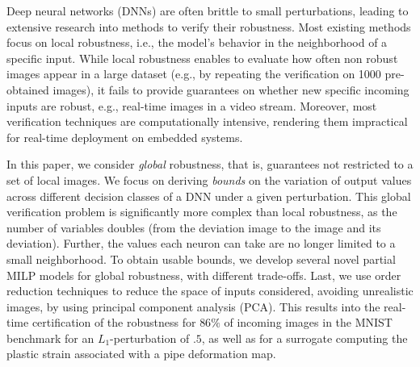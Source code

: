 Deep neural networks (DNNs) are often brittle to small perturbations, leading to extensive research into methods to verify their robustness. Most existing methods focus on local robustness, i.e., the model's behavior in the neighborhood of a specific input. While local robustness enables to evaluate how often non robust images appear in a large dataset (e.g., by repeating the verification on 1000 pre-obtained images), it fails to provide guarantees on whether new specific incoming inputs are robust, e.g., real-time images in a video stream. Moreover, most verification techniques are computationally intensive, rendering them impractical for real-time deployment on embedded systems. 

In this paper, we consider {\em global} robustness, that is, guarantees not restricted to a set of local images. We focus on deriving {\em bounds} on the variation of output values across different decision classes of a DNN under a given perturbation. This global verification problem is significantly more complex than local robustness, as the number of variables doubles (from the deviation image to the image and its deviation). Further, the values each neuron can take are no longer limited to a small neighborhood. To obtain usable bounds, we develop several novel partial MILP models for global robustness, with different trade-offs. Last, we use order reduction techniques to reduce the space of inputs considered, avoiding unrealistic images, by using principal component analysis (PCA). This results into the real-time  certification of the robustness for $86\%$ of incoming images in the MNIST benchmark for an $L_1$-perturbation of $.5$, as well as for a surrogate computing the 
plastic strain associated with a pipe deformation map.